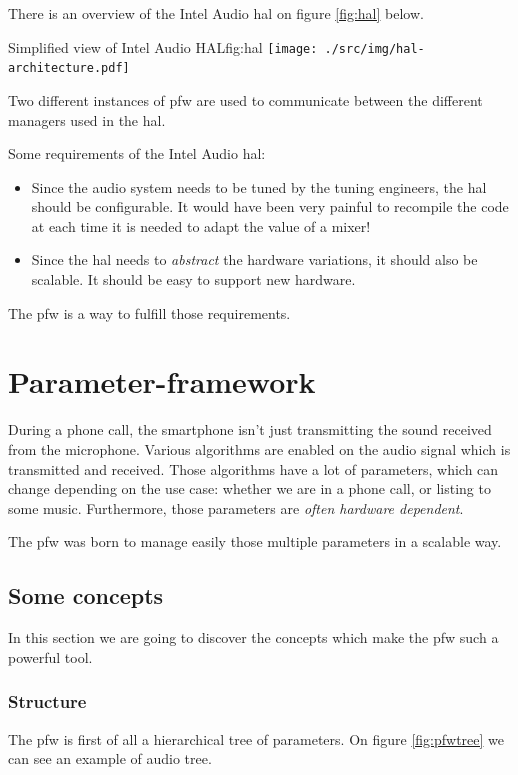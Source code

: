There is an overview of the Intel Audio \gls{hal} on figure \ref{fig:hal} below.
\begin{figureGraphics}{Simplified view of Intel Audio HAL}{fig:hal}
\texttt{[image: ./src/img/hal-architecture.pdf]}
\end{figureGraphics}
Two different instances of \gls{pfw} are used to communicate between the
different managers used in the \gls{hal}.

Some requirements of the Intel Audio \gls{hal}:
\begin{itemize}
    \item Since the audio system needs to be tuned by the tuning engineers, the \gls{hal} should be configurable.
        It would have been very painful to recompile the code at each time it is needed to adapt the value of a mixer!
    \item Since the \gls{hal} needs to \emph{abstract} the hardware variations, it should also be scalable. It should be
        easy to support new hardware.
\end{itemize}

The \gls{pfw} is a way to fulfill those requirements.

\section{Parameter-framework}
\label{sec:parameter-framework}
During a phone call, the smartphone isn't just transmitting the sound received from the microphone. Various algorithms are
enabled on the audio signal which is transmitted and received.
Those algorithms have a lot of parameters, which can change depending on the use case: whether we are in a phone call,
or listing to some music. Furthermore, those parameters are \emph{often hardware dependent}.

The \gls{pfw} was born to manage easily those multiple parameters in a scalable way.

\subsection{Some concepts}
In this section we are going to discover the concepts which make the
\gls{pfw} such a powerful tool.

\subsubsection{Structure}
The \gls{pfw} is first of all a hierarchical tree of parameters.
On figure \ref{fig:pfwtree} we can see an example of audio tree.

